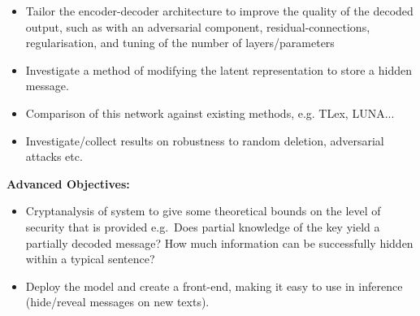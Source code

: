 \documentclass[10pt]{article}
\begin{document}
  \begin{itemize}  
    \item Tailor the encoder-decoder architecture to improve the quality of the decoded output, such as with an adversarial component, residual-connections, regularisation, and tuning of the number of layers/parameters
    \item Investigate a method of modifying the latent representation to store a hidden message.
    \item Comparison of this network against existing methods, e.g. TLex, LUNA...
    \item Investigate/collect results on robustness to random deletion, adversarial attacks etc.\
  \end{itemize}
{\bf Advanced Objectives:}
  \begin{itemize}  
    \item Cryptanalysis of system to give some theoretical bounds on the level of security that is provided e.g.\ Does partial knowledge of the key yield a partially decoded message? How much information can be successfully hidden within a typical sentence?
    \item Deploy the model and create a front-end, making it easy to use in inference (hide/reveal messages on new texts).
  \end{itemize}
\newpage
\nocite{*}

\end{document}
